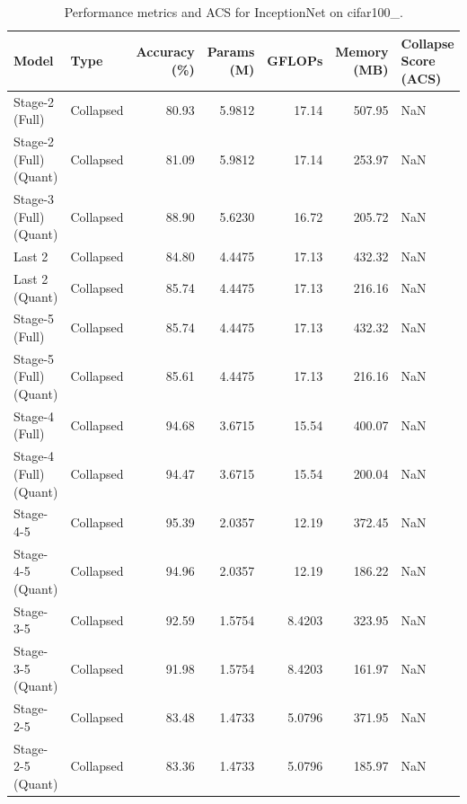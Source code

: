 \begin{table}
\caption{Performance metrics and ACS for InceptionNet on cifar100_.}
\label{tab:InceptionNet_cifar100_}
\begin{tabular}{llrrrrl}
\toprule
Model & Type & Accuracy (\%) & Params (M) & GFLOPs & Memory (MB) & Collapse Score (ACS) \\
\midrule
Stage-2 (Full) & Collapsed & 80.93 & 5.9812 & 17.14 & 507.95 & NaN \\
Stage-2 (Full)
(Quant) & Collapsed & 81.09 & 5.9812 & 17.14 & 253.97 & NaN \\
Stage-3 (Full)
(Quant) & Collapsed & 88.90 & 5.6230 & 16.72 & 205.72 & NaN \\
Last 2 & Collapsed & 84.80 & 4.4475 & 17.13 & 432.32 & NaN \\
Last 2
(Quant) & Collapsed & 85.74 & 4.4475 & 17.13 & 216.16 & NaN \\
Stage-5 (Full) & Collapsed & 85.74 & 4.4475 & 17.13 & 432.32 & NaN \\
Stage-5 (Full)
(Quant) & Collapsed & 85.61 & 4.4475 & 17.13 & 216.16 & NaN \\
Stage-4 (Full) & Collapsed & 94.68 & 3.6715 & 15.54 & 400.07 & NaN \\
Stage-4 (Full)
(Quant) & Collapsed & 94.47 & 3.6715 & 15.54 & 200.04 & NaN \\
Stage-4-5 & Collapsed & 95.39 & 2.0357 & 12.19 & 372.45 & NaN \\
Stage-4-5
(Quant) & Collapsed & 94.96 & 2.0357 & 12.19 & 186.22 & NaN \\
Stage-3-5 & Collapsed & 92.59 & 1.5754 & 8.4203 & 323.95 & NaN \\
Stage-3-5
(Quant) & Collapsed & 91.98 & 1.5754 & 8.4203 & 161.97 & NaN \\
Stage-2-5 & Collapsed & 83.48 & 1.4733 & 5.0796 & 371.95 & NaN \\
Stage-2-5
(Quant) & Collapsed & 83.36 & 1.4733 & 5.0796 & 185.97 & NaN \\
\bottomrule
\end{tabular}
\end{table}
